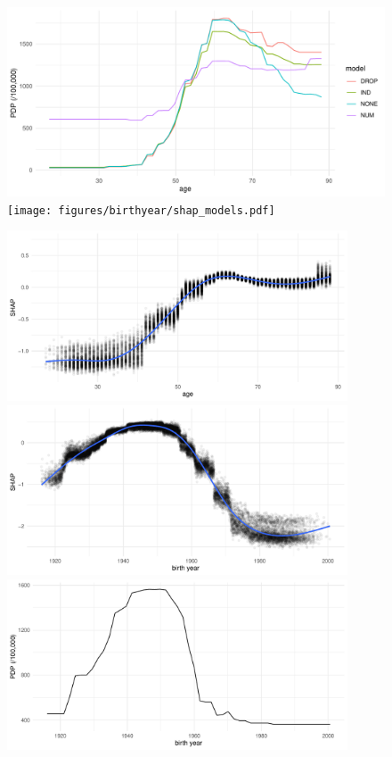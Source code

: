 \documentclass[12pt]{article}
\begin{document}
\begin{figure}[h]
\centering
\includegraphics[width=1.0\textwidth]{figures/birthyear/pdp_models.pdf}
\texttt{[image: figures/birthyear/shap\_models.pdf]}
\end{figure}


\begin{figure}[h]
\centering
\includegraphics[width=0.9\textwidth]{figures/birthyear/shap_num_age.pdf}
\includegraphics[width=0.9\textwidth]{figures/birthyear/shap_num_by.pdf}
\includegraphics[width=0.9\textwidth]{figures/birthyear/pdp_by.pdf}
\end{figure}
\end{document}
